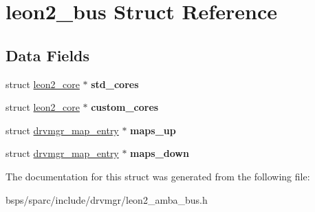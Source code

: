 \hypertarget{structleon2__bus}{}\section{leon2\+\_\+bus Struct Reference}
\label{structleon2__bus}
\subsection*{Data Fields}
\begin{DoxyCompactItemize}
\item 
\mbox{\label{structleon2__bus_a184aa42b7a6675d8a85c74eab00b9968}} 
struct \mbox{\hyperlink{structleon2__core}{leon2\+\_\+core}} $\ast$ {\bfseries std\+\_\+cores}
\item 
\mbox{\label{structleon2__bus_a8d09a1c158b262205308f517cdb504bc}} 
struct \mbox{\hyperlink{structleon2__core}{leon2\+\_\+core}} $\ast$ {\bfseries custom\+\_\+cores}
\item 
\mbox{\label{structleon2__bus_ac82110654a39c3bb0f7b894ddf40d9e2}} 
struct \mbox{\hyperlink{structdrvmgr__map__entry}{drvmgr\+\_\+map\+\_\+entry}} $\ast$ {\bfseries maps\+\_\+up}
\item 
\mbox{\label{structleon2__bus_aa18009748b7abee53f8577d439f99c1d}} 
struct \mbox{\hyperlink{structdrvmgr__map__entry}{drvmgr\+\_\+map\+\_\+entry}} $\ast$ {\bfseries maps\+\_\+down}
\end{DoxyCompactItemize}


The documentation for this struct was generated from the following file\+:\begin{DoxyCompactItemize}
\item 
bsps/sparc/include/drvmgr/leon2\+\_\+amba\+\_\+bus.\+h\end{DoxyCompactItemize}
